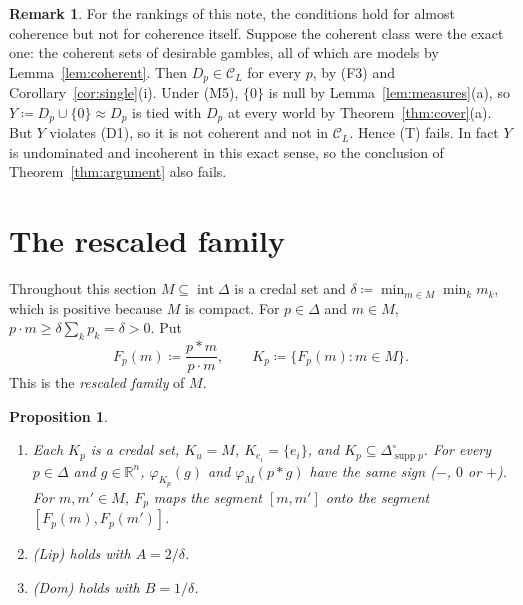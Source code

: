 \documentclass[11pt]{article}
\newtheorem{proposition}[theorem]{Proposition}
\theoremstyle{definition}
\newtheorem{remark}[theorem]{Remark}
\newcommand{\R}{\mathbb R}
\newcommand{\supp}{\operatorname{supp}}
\newcommand{\Cc}{\mathcal C}
\begin{document}
\begin{remark}\label{rem:exact}
For the rankings of this note, the conditions hold for almost coherence but not for coherence itself. Suppose the coherent class were the exact one: the coherent sets of desirable gambles, all of which are models by Lemma~\ref{lem:coherent}. Then $D_p\in\Cc_L$ for every $p$, by (F3) and Corollary~\ref{cor:single}(i). Under (M5), $\{0\}$ is null by Lemma~\ref{lem:measures}(a), so $Y\coloneqq D_p\cup\{0\}\approx D_p$ is tied with $D_p$ at every world by Theorem~\ref{thm:cover}(a). But $Y$ violates (D1), so it is not coherent and not in $\Cc_L$. Hence (T) fails. In fact $Y$ is undominated and incoherent in this exact sense, so the conclusion of Theorem~\ref{thm:argument} also fails.
\end{remark}

\section{The rescaled family}\label{sec:rescaled}

Throughout this section $M\subseteq\operatorname{int}\Delta$ is a credal set and $\delta\coloneqq\min_{m\in M}\min_km_k$, which is positive because $M$ is compact. For $p\in\Delta$ and $m\in M$, $p\cdot m\ge\delta\sum_kp_k=\delta>0$. Put
\[
F_p(m)\coloneqq\frac{p*m}{p\cdot m},\qquad K_p\coloneqq\{F_p(m):m\in M\}.
\]
This is the \emph{rescaled family} of $M$.

\begin{proposition}\label{prop:rescaled}
\begin{enumerate}[label=(\roman*)]
\item Each $K_p$ is a credal set, $K_u=M$, $K_{e_i}=\{e_i\}$, and $K_p\subseteq\Delta^\circ_{\supp p}$. For every $p\in\Delta$ and $g\in\R^n$, $\varphi_{K_p}(g)$ and $\varphi_M(p*g)$ have the same sign ($-$, $0$ or $+$). For $m,m'\in M$, $F_p$ maps the segment $[m,m']$ onto the segment $[F_p(m),F_p(m')]$.
\item (Lip) holds with $A=2/\delta$.
\item (Dom) holds with $B=1/\delta$.
\end{enumerate}
\end{proposition}
\end{document}
